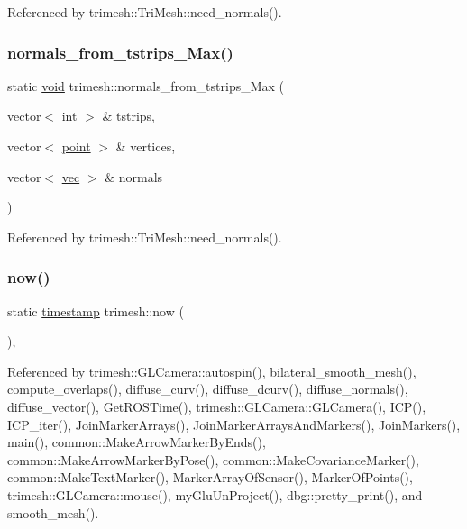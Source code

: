 Referenced by trimesh\+::\+Tri\+Mesh\+::need\+\_\+normals().

\mbox{\label{namespacetrimesh_a1d7c94dce3c861a15780c890a18c9e2c}} 
\subsubsection{\texorpdfstring{normals\+\_\+from\+\_\+tstrips\+\_\+\+Max()}{normals\_from\_tstrips\_Max()}}
{\footnotesize\ttfamily static \hyperlink{namespacetrimesh_a784ddfd979e1c579bda795a8edfc3f43}{void} trimesh\+::normals\+\_\+from\+\_\+tstrips\+\_\+\+Max (\begin{DoxyParamCaption}\item[{vector$<$ int $>$ \&}]{tstrips,  }\item[{vector$<$ \hyperlink{namespacetrimesh_a325b99fd6454b22fa4c4bc3223271b2c}{point} $>$ \&}]{vertices,  }\item[{vector$<$ \hyperlink{namespacetrimesh_a4fc2b83feba99c931f837a0c7d4b4df1}{vec} $>$ \&}]{normals }\end{DoxyParamCaption})\hspace{0.3cm}{\ttfamily [static]}}



Referenced by trimesh\+::\+Tri\+Mesh\+::need\+\_\+normals().

\mbox{\label{namespacetrimesh_a2bac0c9856bf384a1722af520298f84e}} 
\subsubsection{\texorpdfstring{now()}{now()}}
{\footnotesize\ttfamily static \hyperlink{namespacetrimesh_afc360812cb91ca27ac234664b59fe356}{timestamp} trimesh\+::now (\begin{DoxyParamCaption}{ }\end{DoxyParamCaption})\hspace{0.3cm}{\ttfamily [inline]}, {\ttfamily [static]}}



Referenced by trimesh\+::\+G\+L\+Camera\+::autospin(), bilateral\+\_\+smooth\+\_\+mesh(), compute\+\_\+overlaps(), diffuse\+\_\+curv(), diffuse\+\_\+dcurv(), diffuse\+\_\+normals(), diffuse\+\_\+vector(), Get\+R\+O\+S\+Time(), trimesh\+::\+G\+L\+Camera\+::\+G\+L\+Camera(), I\+C\+P(), I\+C\+P\+\_\+iter(), Join\+Marker\+Arrays(), Join\+Marker\+Arrays\+And\+Markers(), Join\+Markers(), main(), common\+::\+Make\+Arrow\+Marker\+By\+Ends(), common\+::\+Make\+Arrow\+Marker\+By\+Pose(), common\+::\+Make\+Covariance\+Marker(), common\+::\+Make\+Text\+Marker(), Marker\+Array\+Of\+Sensor(), Marker\+Of\+Points(), trimesh\+::\+G\+L\+Camera\+::mouse(), my\+Glu\+Un\+Project(), dbg\+::pretty\+\_\+print(), and smooth\+\_\+mesh().

